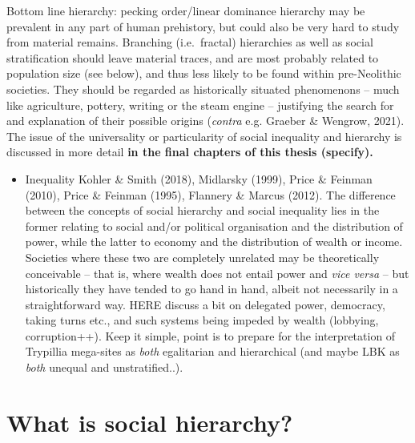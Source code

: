 \documentclass[
  12pt,
]{book}
\providecommand{\tightlist}{%
  \setlength{\itemsep}{0pt}\setlength{\parskip}{0pt}}
\begin{document}
Bottom line hierarchy: pecking order/linear dominance hierarchy may be prevalent in any part of human prehistory, but could also be very hard to study from material remains. Branching (i.e.~fractal) hierarchies as well as social stratification should leave material traces, and are most probably related to population size (see below), and thus less likely to be found within pre-Neolithic societies. They should be regarded as historically situated phenomenons -- much like agriculture, pottery, writing or the steam engine -- justifying the search for and explanation of their possible origins (\emph{contra} e.g. Graeber \& Wengrow, 2021). The issue of the universality or particularity of social inequality and hierarchy is discussed in more detail \textbf{in the final chapters of this thesis (specify).}

\begin{itemize}
\tightlist
\item
  Inequality Kohler \& Smith (2018), Midlarsky (1999), Price \& Feinman (2010), Price \& Feinman (1995), Flannery \& Marcus (2012). The difference between the concepts of social hierarchy and social inequality lies in the former relating to social and/or political organisation and the distribution of power, while the latter to economy and the distribution of wealth or income. Societies where these two are completely unrelated may be theoretically conceivable -- that is, where wealth does not entail power and \emph{vice versa} -- but historically they have tended to go hand in hand, albeit not necessarily in a straightforward way. HERE discuss a bit on delegated power, democracy, taking turns etc., and such systems being impeded by wealth (lobbying, corruption++). Keep it simple, point is to prepare for the interpretation of Trypillia mega-sites as \emph{both} egalitarian and hierarchical (and maybe LBK as \emph{both} unequal and unstratified..).
\end{itemize}

\hypertarget{social-hierarchy}{%
\section{What is social hierarchy?}\label{social-hierarchy}}
\end{document}
